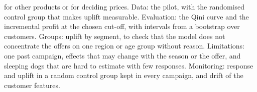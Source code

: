 \begin{description}[font=\bfseries,leftmargin=0pt,itemsep=5pt]
for other products or for deciding prices. Data: the pilot, with the randomised control group that
makes uplift measurable. Evaluation: the Qini curve and the incremental profit at the chosen cut-off,
with intervals from a bootstrap over customers. Groups: uplift by segment, to check that the model
does not concentrate the offers on one region or age group without reason. Limitations: one past
campaign, effects that may change with the season or the offer, and sleeping dogs that are hard to
estimate with few responses. Monitoring: response and uplift in a random control group kept in
every campaign, and drift of the customer features.
\end{description}

